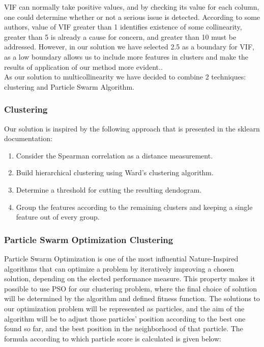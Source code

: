 \documentclass[conference]{IEEEtran}
\begin{document}
VIF can normally take positive values, and by checking its value for each column, one could determine whether or not a serious issue is detected. According to some authors, value of VIF greater than 1 identifies existence of some collinearity, greater than 5 is already a cause for concern, and greater than 10 must be addressed. However, in our solution we have selected 2.5 as a boundary for VIF, as a low boundary allows us to include more features in clusters and make the results of application of our method more evident.\cite{menard2002applied}.\\

As our solution to multicollinearity we have decided to combine 2 techniques: clustering and Particle Swarm Algorithm.\\

\subsubsection{Clustering}

Our solution is inspired by the following approach that is presented in the sklearn documentation\cite{sklearn_permutation}:
\begin{enumerate}
	\item Consider the Spearman correlation as a distance measurement.
	\item Build hierarchical clustering using Ward's clustering algorithm.
	\item Determine a threshold for cutting the resulting dendogram.
	\item Group the features according to the remaining clusters and keeping a single feature out of every group.	
\end{enumerate}

\subsubsection{Particle Swarm Optimization Clustering}

Particle Swarm Optimization is one of the most influential Nature-Inspired algorithms that can optimize a problem by iteratively improving a chosen solution, depending on the elected performance measure\cite{ballardini2018tutorial}. This property makes it possible to use PSO for our clustering problem, where the final choice of solution will be determined by the algorithm and defined fitness function. The solutions to our optimization problem will be represented as particles, and the aim of the algorithm will be to adjust those particles' position according to the best one found so far, and the best position in the neighborhood of that particle. The formula according to which particle score is calculated is given below:\\
\end{document}

